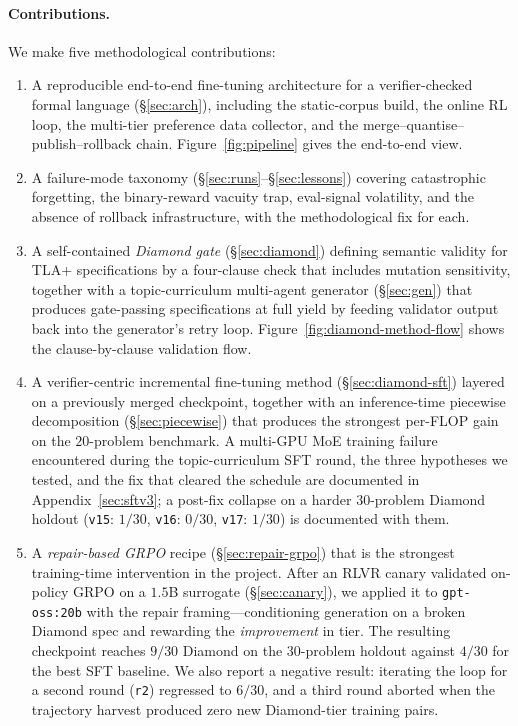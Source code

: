 \documentclass[11pt]{article}
\begin{document}
\paragraph{Contributions.} We make five methodological contributions:
\begin{enumerate}[leftmargin=1.4em,itemsep=2pt]
\item A reproducible end-to-end fine-tuning architecture for a verifier-checked
  formal language (\S\ref{sec:arch}), including the static-corpus build,
  the online RL loop, the multi-tier preference data collector, and the
  merge--quantise--publish--rollback chain.
  Figure~\ref{fig:pipeline} gives the end-to-end view.
\item A failure-mode taxonomy (\S\ref{sec:runs}--\S\ref{sec:lessons})
  covering catastrophic forgetting, the binary-reward vacuity trap,
  eval-signal volatility, and the absence of rollback infrastructure,
  with the methodological fix for each.
\item A self-contained \emph{Diamond gate} (\S\ref{sec:diamond}) defining
  semantic validity for TLA+ specifications by a four-clause check that
  includes mutation sensitivity, together with a topic-curriculum
  multi-agent generator (\S\ref{sec:gen}) that produces gate-passing
  specifications at full yield by feeding validator output back into the
  generator's retry loop. Figure~\ref{fig:diamond-method-flow}
  shows the clause-by-clause validation flow.
\item A verifier-centric incremental fine-tuning method
  (\S\ref{sec:diamond-sft}) layered on a previously merged checkpoint,
  together with an inference-time piecewise decomposition
  (\S\ref{sec:piecewise}) that produces the strongest per-FLOP gain on
  the $20$-problem benchmark. A multi-GPU MoE training failure
  encountered during the topic-curriculum SFT round, the three
  hypotheses we tested, and the fix that cleared the schedule are
  documented in Appendix~\ref{sec:sftv3}; a post-fix collapse on a
  harder $30$-problem Diamond holdout (\texttt{v15}: $1/30$,
  \texttt{v16}: $0/30$, \texttt{v17}: $1/30$) is documented with them.
\item A \emph{repair-based GRPO} recipe (\S\ref{sec:repair-grpo}) that
  is the strongest training-time intervention in the project. After an
  RLVR canary validated on-policy GRPO on a $1.5$B surrogate
  (\S\ref{sec:canary}), we applied it to \texttt{gpt-oss:20b} with the
  repair framing---conditioning generation on a broken Diamond spec
  and rewarding the \emph{improvement} in tier. The resulting
  checkpoint reaches $9/30$ Diamond on the $30$-problem holdout
  against $4/30$ for the best SFT baseline. We also report a negative
  result: iterating the loop for a second round (\texttt{r2}) regressed
  to $6/30$, and a third round aborted when the trajectory harvest
  produced zero new Diamond-tier training pairs.
\end{enumerate}
\end{document}
